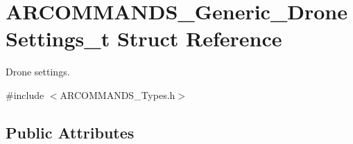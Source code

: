 \hypertarget{struct_a_r_c_o_m_m_a_n_d_s___generic___drone_settings__t}{}\section{A\+R\+C\+O\+M\+M\+A\+N\+D\+S\+\_\+\+Generic\+\_\+\+Drone\+Settings\+\_\+t Struct Reference}
\label{struct_a_r_c_o_m_m_a_n_d_s___generic___drone_settings__t}


Drone settings.  




{\ttfamily \#include $<$A\+R\+C\+O\+M\+M\+A\+N\+D\+S\+\_\+\+Types.\+h$>$}

\subsection*{Public Attributes}
